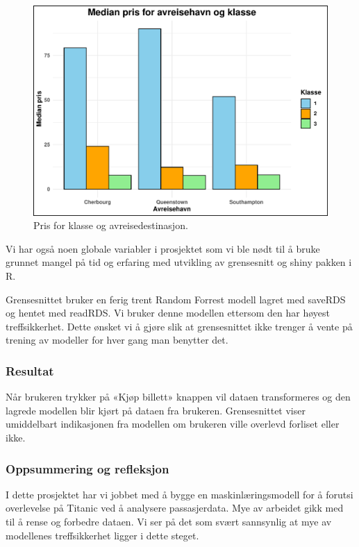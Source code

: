 \documentclass[
]{article}
\begin{document}
\begin{figure}[H]

{\centering \includegraphics[width=0.8\linewidth]{presentation_files/figure-latex/unnamed-chunk-13-1} 

}

\caption{Pris for klasse og avreisedestinasjon.}\label{fig:unnamed-chunk-13}
\end{figure}

Vi har også noen globale variabler i prosjektet som vi ble nødt til å
bruke grunnet mangel på tid og erfaring med utvikling av grensesnitt og
shiny pakken i R.

Grensesnittet bruker en ferig trent Random Forrest modell lagret med
saveRDS og hentet med readRDS. Vi bruker denne modellen ettersom den har
høyest treffsikkerhet. Dette ønsket vi å gjøre slik at grensesnittet
ikke trenger å vente på trening av modeller for hver gang man benytter
det.

\subsubsection{Resultat}\label{resultat}

Når brukeren trykker på «Kjøp billett» knappen vil dataen transformeres
og den lagrede modellen blir kjørt på dataen fra brukeren. Grensesnittet
viser umiddelbart indikasjonen fra modellen om brukeren ville overlevd
forliset eller ikke.

\subsubsection{Oppsummering og
refleksjon}\label{oppsummering-og-refleksjon}

I dette prosjektet har vi jobbet med å bygge en maskinlæringsmodell for
å forutsi overlevelse på Titanic ved å analysere passasjerdata. Mye av
arbeidet gikk med til å rense og forbedre dataen. Vi ser på det som
svært sannsynlig at mye av modellenes treffsikkerhet ligger i dette
steget.
\end{document}
